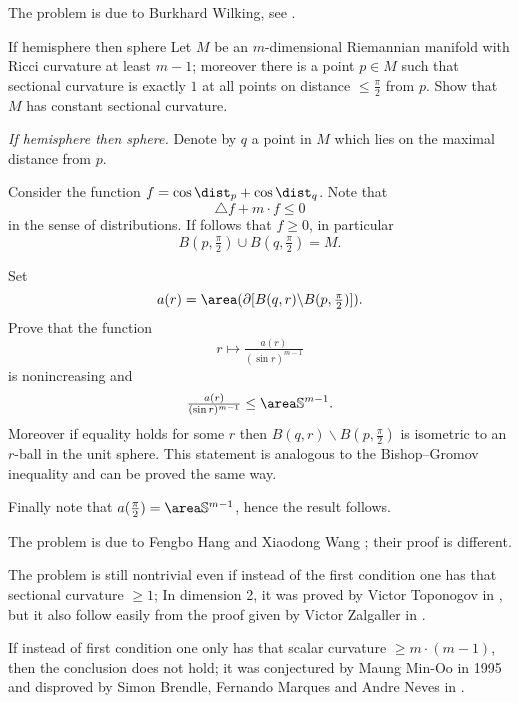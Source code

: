 The problem is due to Burkhard Wilking, see \cite{wilking-2000}.














\begin{pr}{\thm}{If hemisphere then sphere}\label{hS=>S} 
Let $M$ be an $m$-dimensional Riemannian manifold with Ricci curvature at least $m-1$;
moreover there is a point $p\in M$ such that sectional curvature is exactly $1$ at all points on distance $\le \tfrac\pi2$ from $p$.
Show that $M$ has constant sectional curvature.
\end{pr}

\textit{If hemisphere then sphere.}
Denote by $q$ a point in $M$ which lies on the maximal distance from $p$.

Consider the function $f=\cos \dist_p+\cos\dist_q$.
Note that 
\[\triangle f+m\cdot f\le 0\] 
in the sense of distributions.
If follows that $f\ge 0$, in particular 
\[B(p,\tfrac\pi2)\cup B(q,\tfrac\pi2)=M.\]

Set \[a(r)=\area(\partial [B(q,r)\backslash B(p,\tfrac\pi2)]).\]
Prove that the function
\[r \mapsto \tfrac{a(r)}{(\sin r)^{m-1}}\]
is nonincreasing 
and 
\[\tfrac{a(r)}{(\sin r)^{m-1}}\le\area\mathbb{S}^{m-1}.\]
Moreover if equality holds for some $r$ then $B(q,r)\backslash B(p,\tfrac\pi2)$ is isometric to an $r$-ball in the unit sphere.
This statement is analogous to the Bishop--Gromov inequality and can be proved the same way.

Finally note that $a(\tfrac\pi2)=\area\mathbb{S}^{m-1}$,
hence the result follows.
 

The problem is due to Fengbo Hang %
and Xiaodong Wang %
\cite{hang-wang};
their proof is different.

The problem is still nontrivial 
even if instead of the first condition one has that sectional curvature $\ge 1$;
In dimension 2, 
it was proved by Victor Toponogov in \cite{toponogov},
but it also follow easily from the proof given by Victor Zalgaller in \cite{zalgaller-shperical-polygon}.


If instead of first condition one only has that scalar curvature $\ge m\cdot(m-1)$, then the conclusion does not hold; 
it was conjectured by Maung Min-Oo in 1995 
and disproved by
Simon Brendle,
Fernando Marques
and Andre Neves in \cite{brendle-marques-neve}.











